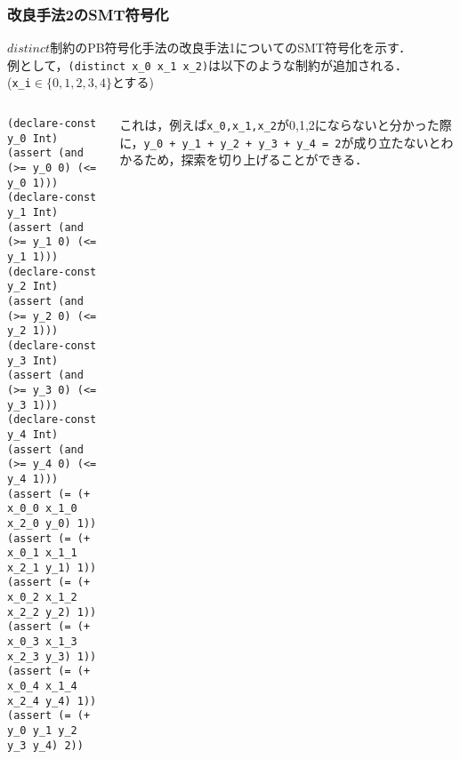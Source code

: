 \documentclass [dvipdfmx,11pt]{beamer}
\newcommand{\backupend}{
    \addtocounter{framenumberappendix}{-\value{framenumber}}
    \addtocounter{framenumber}{\value{framenumberappendix}}
}
\newcommand{\distinct}{$distinct$}
\begin{document}
\begin{frame}[fragile]\footnotesize
    \frametitle{改良手法2のSMT符号化}
    \distinct 制約のPB符号化手法の改良手法1についてのSMT符号化を示す．\\
    例として，\verb|(distinct x_0 x_1 x_2)|は以下のような制約が追加される．\\
    (\verb|x_i|$\in \{0,1,2,3,4\}$とする)

    \begin{columns}
        \begin{column}{0.5\textwidth}
            \begin{exampleblock}{}\scriptsize
\begin{verbatim}
(declare-const y_0 Int)
(assert (and (>= y_0 0) (<= y_0 1)))
(declare-const y_1 Int)
(assert (and (>= y_1 0) (<= y_1 1)))
(declare-const y_2 Int)
(assert (and (>= y_2 0) (<= y_2 1)))
(declare-const y_3 Int)
(assert (and (>= y_3 0) (<= y_3 1)))
(declare-const y_4 Int)
(assert (and (>= y_4 0) (<= y_4 1)))
(assert (= (+ x_0_0 x_1_0 x_2_0 y_0) 1))
(assert (= (+ x_0_1 x_1_1 x_2_1 y_1) 1))
(assert (= (+ x_0_2 x_1_2 x_2_2 y_2) 1))
(assert (= (+ x_0_3 x_1_3 x_2_3 y_3) 1))
(assert (= (+ x_0_4 x_1_4 x_2_4 y_4) 1))
(assert (= (+ y_0 y_1 y_2 y_3 y_4) 2))
\end{verbatim}
            \end{exampleblock}
        \end{column}
        \begin{column}{0.5\textwidth}\scriptsize
            これは，例えば\verb|x_0,x_1,x_2|が0,1,2にならないと分かった際に，\verb|y_0 + y_1 + y_2 + y_3 + y_4 = 2|が成り立たないとわかるため，探索を切り上げることができる．
        \end{column}
    \end{columns}

\end{frame}


\backupend
\end{document}
